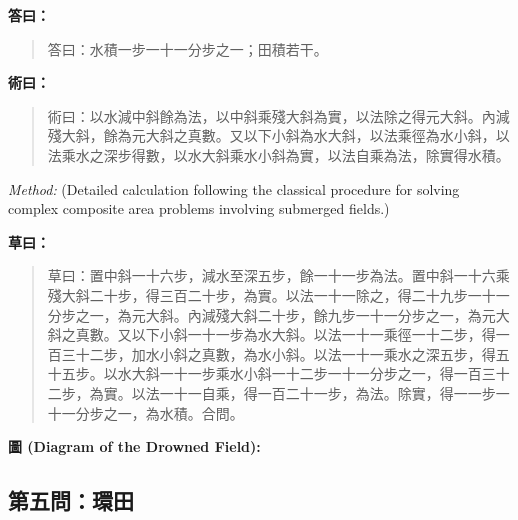 \documentclass[11pt,a4paper]{article}
\newenvironment{answer}{%
  \medskip\noindent{\color{answercolor}\rule{0.5\textwidth}{0.5pt}}%
  \par\color{answercolor}%
}{%
  \par\medskip%
}
\newenvironment{method}{%
  \medskip\noindent{\color{methodcolor}\rule{0.5\textwidth}{0.5pt}}%
  \par\color{methodcolor}%
}{%
  \par\medskip%
}
\begin{document}
\begin{answer}
\textbf{答曰：}

\begin{quote}
\textcolor{chinacolor}{%
答曰：水積一步一十一分步之一；田積若干。
}
\end{quote}
\end{answer}

\begin{method}
\textbf{術曰：}

\begin{quote}
\textcolor{chinacolor}{%
術曰：以水減中斜餘為法，以中斜乘殘大斜為實，以法除之得元大斜。內減殘大斜，餘為元大斜之真數。又以下小斜為水大斜，以法乘徑為水小斜，以法乘水之深步得數，以水大斜乘水小斜為實，以法自乘為法，除實得水積。
}
\end{quote}

\textit{Method:} (Detailed calculation following the classical procedure 
for solving complex composite area problems involving submerged fields.)
\end{method}

\noindent\textbf{草曰：}
\begin{quote}
\textcolor{chinacolor}{%
草曰：置中斜一十六步，減水至深五步，餘一十一步為法。置中斜一十六乘殘大斜二十步，得三百二十步，為實。以法一十一除之，得二十九步一十一分步之一，為元大斜。內減殘大斜二十步，餘九步一十一分步之一，為元大斜之真數。又以下小斜一十一步為水大斜。以法一十一乘徑一十二步，得一百三十二步，加水小斜之真數，為水小斜。以法一十一乘水之深五步，得五十五步。以水大斜一十一步乘水小斜一十二步一十一分步之一，得一百三十二步，為實。以法一十一自乘，得一百二十一步，為法。除實，得一一步一十一分步之一，為水積。合問。
}
\end{quote}

\noindent\textbf{圖 (Diagram of the Drowned Field):}
\begin{center}
\end{center}

\subsection*{第五問：環田}
\end{document}
